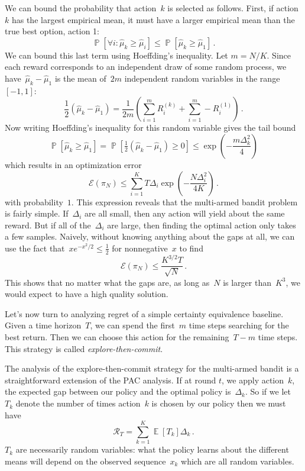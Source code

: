 \documentclass{tufte-book}
\begin{document}
We can bound the probability that action~\(k\) is selected as follows.
First, if action~\(k\) has the largest empirical mean, it must have a
larger empirical mean than the true best option, action 1: \[
\mathop\mathbb{P}[\forall i\colon \hat{\mu}_k \geq \hat{\mu}_i]
\leq \mathop\mathbb{P}[ \hat{\mu}_k \geq \hat{\mu}_1]\,.
\] We can bound this last term using Hoeffding's inequality. Let
\(m=N/K\). Since each reward corresponds to an independent draw of some
random process, we have~\(\hat{\mu}_k - \hat{\mu}_1\) is the mean
of~\(2m\) independent random variables in the range~\([-1,1]\): \[
    \frac{1}{2} (\hat{\mu}_k - \hat{\mu}_1) =  \frac{1}{2m} \left( \sum_{i=1}^m R_i^{(k)} +\sum_{i=1}^m -R_i^{(1)} \right)\,.
\] Now writing Hoeffding's inequality for this random variable gives the
tail bound \[
\mathop\mathbb{P}[ \hat{\mu}_k \geq \hat{\mu}_1]
=\mathop\mathbb{P}[ \tfrac{1}{2}( \hat{\mu}_k- \hat{\mu}_1) \geq 0]
\leq \exp\left(-\frac{m\Delta_k^2}{4}\right)
\] which results in an optimization error \[
    \mathcal{E}(\pi_N) \leq \sum_{i=1}^K T \Delta_i \exp\left(-\frac{N\Delta_i^2}{4K}\right)\,.
\] with probability~\(1\). This expression reveals that the multi-armed
bandit problem is fairly simple. If~\(\Delta_i\) are all small, then any
action will yield about the same reward. But if all of the~\(\Delta_i\)
are large, then finding the optimal action only takes a few samples.
Naively, without knowing anything about the gaps at all, we can use the
fact that~\(x e^{-x^2/2}\leq \tfrac{1}{2}\) for nonnegative~\(x\) to
find \[
    \mathcal{E}(\pi_N) \leq \frac{K^{3/2} T}{\sqrt{N}}\,.
\] This shows that no matter what the gaps are, as long as~\(N\) is
larger than~\(K^3\), we would expect to have a high quality solution.

Let's now turn to analyzing regret of a simple certainty equivalence
baseline. Given a time horizon~\(T\), we can spend the first~\(m\) time
steps searching for the best return. Then we can choose this action for
the remaining~\(T-m\) time steps. This strategy is called
\emph{explore-then-commit}.

The analysis of the explore-then-commit strategy for the multi-armed
bandit is a straightforward extension of the PAC analysis. If at round
\(t\), we apply action~\(k\), the expected gap between our policy and
the optimal policy is~\(\Delta_k\). So if we let~\(T_k\) denote the
number of times action~\(k\) is chosen by our policy then we must have
\[
    \mathcal{R}_T = \sum_{k=1}^K \mathop\mathbb{E}[T_k]\Delta_k\,.
\] \(T_k\) are necessarily random variables: what the policy learns
about the different means will depend on the observed sequence~\(x_k\)
which are all random variables.
\end{document}
